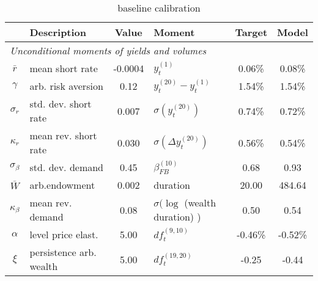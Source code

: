\begin{table}[htbp]  
\centering  
\bgroup  
\def\arraystretch{1.25}  
\begin{tabular}{clclcc} \hline  
& Description & Value & Moment & Target & Model \\ \hline  
\multicolumn{6}{l}{\emph{Unconditional moments of yields and volumes}} \\  
$\bar{r}$  & mean short rate & -0.0004  & $y_{t}^{(1)}$ & 0.06\% & 0.08\%   \\ 
$\gamma$  & arb. risk aversion & 0.12  & $y_{t}^{(20)}-y_{t}^{(1)}$ & 1.54\% & 1.54\%   \\ 
$\sigma_r$ & std. dev. short rate & 0.007 & $\sigma ( y_{t}^{(20)} )$  & 0.74\% & 0.72\% \\ 
$\kappa_r$ & mean rev. short rate & 0.030 & $\sigma (\Delta y_{t}^{(20)})$ & 0.56\% & 0.54\% \\ 
$\sigma_{\beta}$ & std. dev. demand & 0.45 & $ \beta^{(10)}_{FB} $ & 0.68 & 0.93 \\ 
$\bar{W}$ & arb.endowment & 0.002 & duration & 20.00 & 484.64 \\ 
$\kappa_{\beta}$ & mean rev. demand & 0.08 & $\sigma (\log $ (wealth duration) ) & 0.50 & 0.54 \\ 
$\alpha$ & level price elast. & 5.00 & $ df_t^{(9,10)} $ & -0.46\% & -0.52\% \\ 
$\xi$ & persistence arb. wealth & 5.00 & $ df_t^{(19,20)} $ & -0.25 & -0.44 \\ 
\end{tabular} 
\egroup 
\caption{baseline calibration} 
\label{tab:cal} 
\end{table} 
